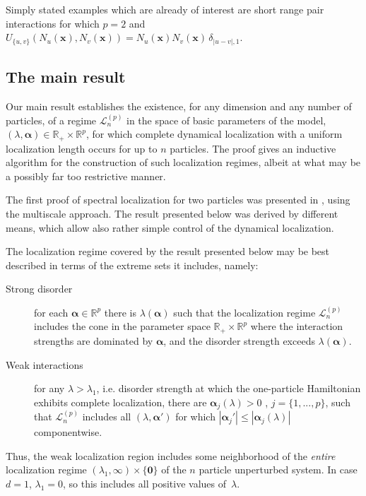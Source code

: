 \documentclass[reqno,keywordsasfootnote]{article}
\numberwithin{equation}{section}
\theoremstyle{definition}
\begin{document}
Simply stated examples which are already of interest  are short range pair interactions for which 
$ p = 2 $  and 
$ U_{\{u,v\}}\left(  N_{u}({\mathbf{x}}), N_{v}({\mathbf{x}}) \right) =    N_{u}({\mathbf{x}})  N_{v}({\mathbf{x}})   \, \delta_{| u - v |, 1}$.

\subsection{The main result}
Our main result establishes the existence, for any dimension and any number of particles, of a regime $ \mathcal{L}^{(p)}_n $ in the space of basic parameters of the model, $(\lambda, {\boldsymbol{\alpha}}) \in \mathbb{R}_+ \times \mathbb{R}^{p} $, for which
complete dynamical localization with a uniform localization length occurs for up to $ n $ particles. 
The proof gives an inductive algorithm for the  construction of  such  localization regimes, albeit at what may be a possibly far too restrictive manner.   

The first proof of spectral localization for two particles was presented in  \cite{CS09}, using the multiscale approach.  The result presented below was derived by different means, which allow also rather simple control of the dynamical localization.  

The localization regime covered by the result presented below may be best described in 
terms of the extreme sets it includes, namely:

\begin{description}
   \item[Strong disorder]  for  each ${\boldsymbol{\alpha}} \in {\mathbb{R}}^{p}$ there is $\lambda({\boldsymbol{\alpha}} )$ such that the localization regime   $\mathcal{L}^{(p)}_n $ includes the cone in the parameter space $ \mathbb{R}_+ \times \mathbb{R}^{p} $ 
   where the interaction strengths are dominated by ${\boldsymbol{\alpha}}$, and the disorder strength exceeds  $ \lambda({\boldsymbol{\alpha}})$.  
   
   
  \item[Weak interactions]   for any  $\lambda > \lambda_1 $, i.e. disorder strength at which the one-particle Hamiltonian exhibits complete localization,  
   there are  ${\boldsymbol{\alpha}}_j(\lambda) > 0$
 , $j=\{1,...,p\}$, 
  such that $ \mathcal{L}^{(p)}_n$ includes all $(\lambda, {\boldsymbol{\alpha}}') $ for which 
  $|{\boldsymbol{\alpha}}_j'| \le  |{\boldsymbol{\alpha}}_j (\lambda)|$ componentwise.  
    \end{description}
Thus,  
the weak localization region includes some neighborhood of the {\it entire}  localization regime $ (\lambda_1,\infty) \times \{ \mathbf{0} \} $ of the $n$ particle 
unperturbed system. In case $ d = 1 $, $\lambda_1 = 0$, so this includes all positive values of~$ \lambda $. 
\end{document}
